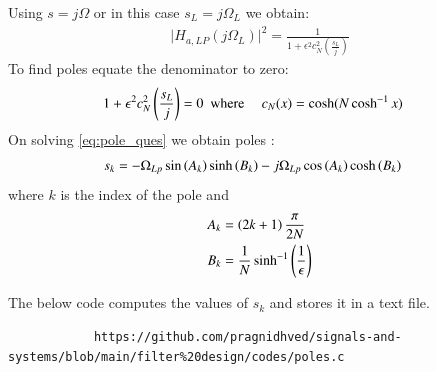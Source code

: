 \documentclass{article}
\begin{document}
\begin{enumerate}
		Using $s=j\Omega$ or in this case $s_{L}=j\Omega_{L}$ we obtain:
		\begin{align}
			\vert H_{a,LP}(j\Omega_L)\vert^2 = \frac{1}{1 + \epsilon^2c_N^2(\frac{s_L}{j})}
		\end{align}
		To find poles equate the denominator to zero:
		\begin{align}
			{1 + \epsilon^2c_N^2\ensuremath{\left(\frac{s_L}{j}\right)}} &=0\hspace{5pt }
			\text{where } \hspace{10pt}  c_N(x)= \cosh(N \cosh^{-1}x) \label{eq:pole_ques}
		\end{align}
		On solving \eqref{eq:pole_ques} we obtain poles :
		\begin{align}
			s_{k} &= -\Omega_{Lp} \sin\left(A_k\right)\sinh\left(B_k\right) - j\Omega_{Lp}\cos\left(A_k\right)\cosh\left(B_k\right)
		\end{align}
		where $k$ is the index of the pole and \\
		\begin{align}
			A_k &= \left(2k+1\right)\frac{\pi}{2N}\\
			B_k &= \frac{1}{N} \sinh^{-1}\left(\frac{1}{\epsilon}\right)
		\end{align}
		
		The below code computes the values of $s_k$ and stores it in a text file. 
		\begin{lstlisting}
			https://github.com/pragnidhved/signals-and-systems/blob/main/filter%20design/codes/poles.c
		\end{lstlisting}
		

\end{enumerate}
\end{document}
